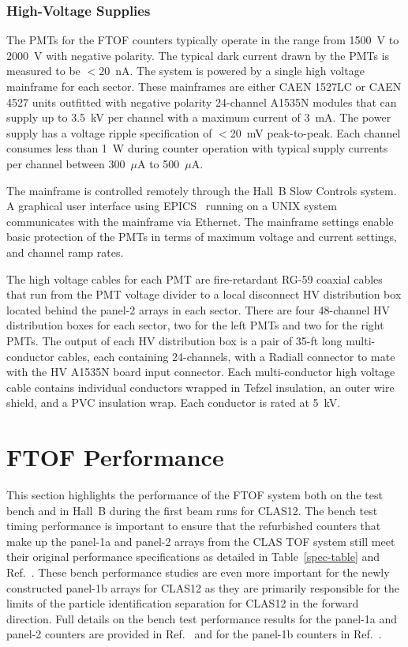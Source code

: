 \documentclass[final,3p,twocolumn]{elsarticle}
\begin{document}
\subsubsection{High-Voltage Supplies}

The PMTs for the FTOF counters typically operate in the range from 1500~V to 2000~V with negative
polarity. The typical dark current drawn by the PMTs is measured to be $<20$~nA. The system is powered
by a single high voltage mainframe for each sector. These mainframes are either CAEN 1527LC or CAEN 4527
units outfitted with negative polarity 24-channel A1535N modules that can supply up to 3.5~kV per channel with
a maximum current of 3~mA. The power supply has a voltage ripple specification of $<$20~mV peak-to-peak.
Each channel consumes less than 1~W during counter operation with typical supply currents per channel between
300~$\mu$A to 500~$\mu$A.

The mainframe is controlled remotely through the Hall~B Slow Controls system. A graphical user interface
using EPICS~\cite{epics} running on a UNIX system communicates with the mainframe via Ethernet. The
mainframe settings enable basic protection of the PMTs in terms of maximum voltage and current settings,
and channel ramp rates.

The high voltage cables for each PMT are fire-retardant RG-59 coaxial cables that run from the PMT
voltage divider to a local disconnect HV distribution box located behind the panel-2 arrays in each
sector. There are four 48-channel HV distribution boxes for each sector, two for the left PMTs and two
for the right PMTs. The output of each HV distribution box is a pair of 35-ft long multi-conductor cables,
each containing 24-channels, with a Radiall connector to mate with the HV A1535N board input connector.
Each multi-conductor high voltage cable contains individual conductors wrapped in Tefzel insulation, an outer
wire shield, and a PVC insulation wrap. Each conductor is rated at 5~kV.

\section{FTOF Performance}
\label{sec:performance}

This section highlights the performance of the FTOF system both on the test bench and in Hall~B during
the first beam runs for CLAS12. The bench test timing performance is important to ensure that the
refurbished counters that make up the panel-1a and panel-2 arrays from the CLAS TOF system still meet
their original performance specifications as detailed in Table~\ref{spec-table} and Ref.~\cite{tof-nim}. These
bench performance studies are even more important for the newly constructed panel-1b arrays for CLAS12
as they are primarily responsible for the limits of the particle identification separation for CLAS12 in the
forward direction. Full details on the bench test performance results for the panel-1a and panel-2 counters
are provided in Ref.~\cite{dsc-cn2013-001} and for the panel-1b counters in Ref.~\cite{nim-p1b}.
\end{document}
